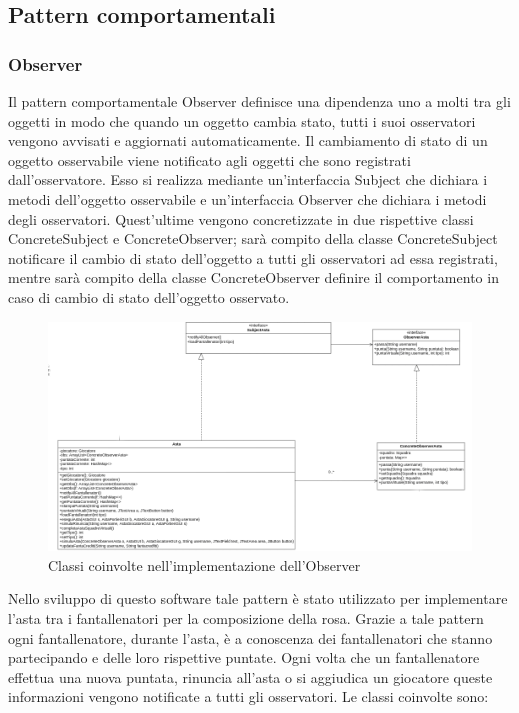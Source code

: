 \documentclass[12pt,a4paper]{article}
\begin{document}
\subsection{Pattern comportamentali}
\subsubsection{Observer}
Il pattern comportamentale Observer definisce una dipendenza uno a molti tra gli oggetti in modo che quando un oggetto cambia stato, tutti i suoi osservatori vengono avvisati e aggiornati automaticamente. Il cambiamento di stato di un oggetto osservabile viene notificato agli oggetti che sono registrati dall'osservatore. Esso si realizza   mediante un'interfaccia Subject che dichiara i metodi dell'oggetto osservabile e un'interfaccia Observer che dichiara i metodi degli osservatori. Quest'ultime vengono concretizzate in due rispettive classi ConcreteSubject e ConcreteObserver; sarà compito della classe  ConcreteSubject notificare il cambio di stato dell'oggetto a tutti gli osservatori ad essa registrati, mentre sarà compito della classe ConcreteObserver definire il comportamento in caso di cambio di stato dell'oggetto osservato.
\begin{figure}[h]
\centering
\includegraphics[width=18 cm ,keepaspectratio]{Observer}
\caption{Classi coinvolte nell'implementazione dell'Observer}
\end{figure}
\newline
Nello sviluppo di questo software tale pattern è stato utilizzato per implementare l'asta tra i fantallenatori  per la composizione della rosa. Grazie a tale pattern ogni fantallenatore, durante l'asta, è a conoscenza dei fantallenatori  che stanno partecipando  e delle loro rispettive puntate. Ogni volta che un fantallenatore effettua una nuova puntata, rinuncia all'asta o si aggiudica un giocatore queste informazioni vengono notificate a tutti gli osservatori.  Le classi coinvolte sono:
\end{document}
